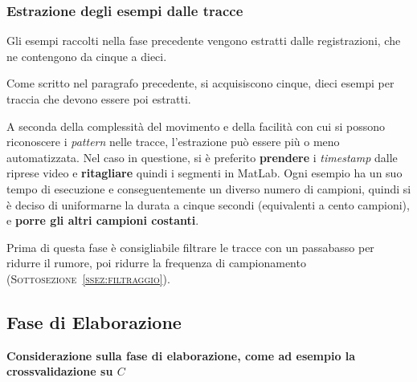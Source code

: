 \subsubsection{Estrazione degli esempi dalle tracce}
Gli esempi raccolti nella fase precedente vengono estratti dalle registrazioni,
che ne contengono da cinque a dieci.

Come scritto nel paragrafo precedente,
si acquisiscono cinque, dieci esempi per traccia
che devono essere poi estratti.

A seconda della complessità del movimento e
della facilità con cui si possono riconoscere i \textit{pattern} nelle tracce,
l'estrazione può essere più o meno automatizzata.
Nel caso in questione, si è preferito \textbf{prendere} i \textit{timestamp}
dalle riprese video e \textbf{ritagliare} quindi i segmenti in MatLab.
Ogni esempio ha un suo tempo di esecuzione e
conseguentemente un diverso numero di campioni,
quindi si è deciso di uniformarne la durata a cinque secondi
(equivalenti a cento campioni),
e \textbf{porre gli altri campioni costanti}.

Prima di questa fase è consigliabile filtrare le tracce con un passabasso per ridurre il rumore,
poi ridurre la frequenza di campionamento (\textsc{Sottosezione~\ref{ssez:filtraggio}}).
\subsection{Fase di Elaborazione}

{\bfseries Considerazione sulla fase di elaborazione,
come ad esempio la crossvalidazione su $C$}

